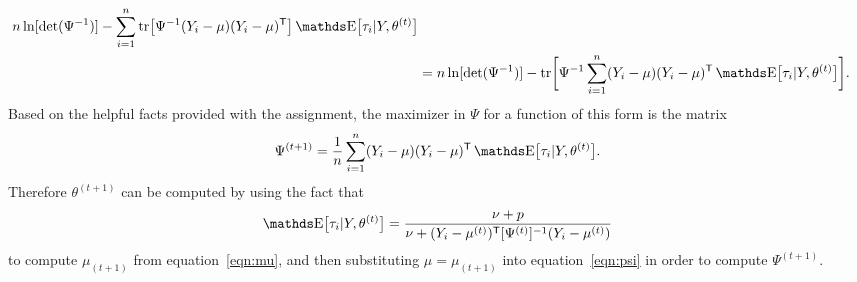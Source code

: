 \begin{enumerate}
\begin{align*}
    n\ln [ \det(\Psi^{-1}) ]
    - \sum_{i=1}^n \tr \bigl[
    \Psi^{-1} (Y_i - \mu) (Y_i - \mu)\T
    \bigr]
    \E \bigl[ \tau_i \vert Y, \theta^{(t)} \bigr]
    \\ &=
    n\ln [ \det(\Psi^{-1}) ]
    - \tr \biggl[ \Psi^{-1} \sum_{i=1}^n
    (Y_i - \mu) (Y_i - \mu)\T
    \E \bigl[ \tau_i \vert Y, \theta^{(t)} \bigr]
    \biggr].
    \end{align*}
Based on the helpful facts provided with the assignment, 
the maximizer in $\Psi$ for a function of this form is the matrix
    \begin{equation}
    \label{eqn:psi}
    \Psi^{(t+1)}
    =
    \frac{1}{n} \sum_{i=1}^n
    (Y_i - \mu) (Y_i - \mu)\T
    \E \bigl[ \tau_i \vert Y, \theta^{(t)} \bigr].
    \end{equation}
Therefore $\theta^{(t+1)}$ can be computed by using the fact that
    \[
    \E \bigl[ \tau_i \vert Y, \theta^{(t)} \bigr]
    =
    \frac{
        \nu + p
    }{
        \nu + (Y_i - \mu^{(t)})\T [\Psi^{(t)}]^{-1} (Y_i - \mu^{(t)})
    }
    \]
to compute $\mu_{(t+1)}$ from equation~\ref{eqn:mu},
and then substituting $\mu = \mu_{(t+1)}$ into equation~\ref{eqn:psi}
in order to compute $\Psi^{(t+1)}$.


\end{enumerate}
